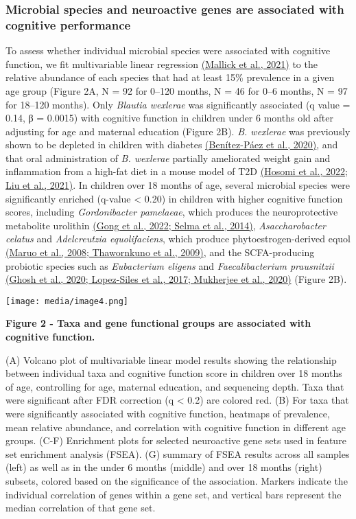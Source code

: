 \subsubsection{Microbial species and neuroactive genes are associated with cognitive performance}

To assess whether individual microbial species were associated with
cognitive function, we fit multivariable linear regression
\href{https://www.zotero.org/google-docs/?4qS6UF}{(Mallick et al.,
2021)} to the relative abundance of each species that had at least 15\%
prevalence in a given age group (Figure 2A, N = 92 for 0--120 months, N
= 46 for 0--6 months, N = 97 for 18--120 months). Only \emph{Blautia
wexlerae} was significantly associated (q value = 0.14, β = 0.0015) with
cognitive function in children under 6 months old after adjusting for
age and maternal education (Figure 2B). \emph{B. wexlerae} was
previously shown to be depleted in children with diabetes
\href{https://www.zotero.org/google-docs/?6mU2nI}{(Benítez-Páez et al.,
2020)}, and that oral administration of \emph{B. wexlerae} partially
ameliorated weight gain and inflammation from a high-fat diet in a mouse
model of T2D \href{https://www.zotero.org/google-docs/?y83hpS}{(Hosomi
et al., 2022; Liu et al., 2021)}. In children over 18 months of age,
several microbial species were significantly enriched (q-value
\textless{} 0.20) in children with higher cognitive function scores,
including \emph{Gordonibacter pamelaeae}, which produces the
neuroprotective metabolite urolithin
\href{https://www.zotero.org/google-docs/?HGtTEY}{(Gong et al., 2022;
Selma et al., 2014)}, \emph{Asaccharobacter celatus} and
\emph{Adelcreutzia equolifaciens}, which produce phytoestrogen-derived
equol \href{https://www.zotero.org/google-docs/?HCKZqm}{(Maruo et al.,
2008; Thawornkuno et al., 2009)}, and the SCFA-producing probiotic
species such as \emph{Eubacterium eligens} and \emph{Faecalibacterium
prausnitzii} \href{https://www.zotero.org/google-docs/?3eyheK}{(Ghosh et
al., 2020; Lopez-Siles et al., 2017; Mukherjee et al., 2020)} (Figure
2B).

\texttt{[image: media/image4.png]}

\textbf{Figure 2 - Taxa and gene functional groups are associated with cognitive function.}

(A) Volcano plot of multivariable linear model results showing the
relationship between individual taxa and cognitive function score in
children over 18 months of age, controlling for age, maternal education,
and sequencing depth. Taxa that were significant after FDR correction (q
\textless{} 0.2) are colored red. (B) For taxa that were significantly
associated with cognitive function, heatmaps of prevalence, mean
relative abundance, and correlation with cognitive function in different
age groups. (C-F) Enrichment plots for selected neuroactive gene sets
used in feature set enrichment analysis (FSEA). (G) summary of FSEA
results across all samples (left) as well as in the under 6 months
(middle) and over 18 months (right) subsets, colored based on the
significance of the association. Markers indicate the individual
correlation of genes within a gene set, and vertical bars represent the
median correlation of that gene set.

